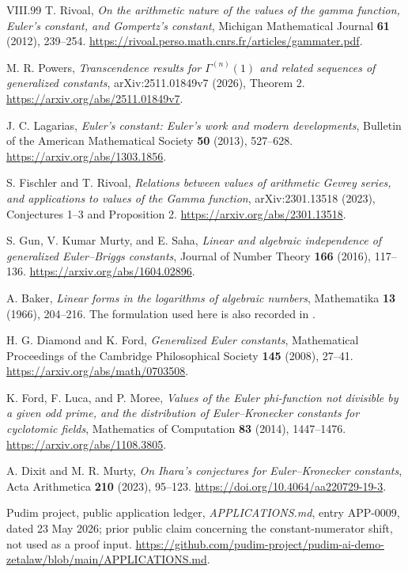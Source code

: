 \documentclass[11pt,a4paper]{article}
\theoremstyle{definition}
\theoremstyle{remark}
\numberwithin{equation}{section}
\begin{document}
\begin{thebibliography}{VIII.99}
T. Rivoal, \emph{On the arithmetic nature of the values of the gamma
function, Euler's constant, and Gompertz's constant},
Michigan Mathematical Journal \textbf{61} (2012), 239--254.
\url{https://rivoal.perso.math.cnrs.fr/articles/gammater.pdf}.

M. R. Powers, \emph{Transcendence results for $\Gamma^{(n)}(1)$ and
related sequences of generalized constants}, arXiv:2511.01849v7
(2026), Theorem 2.
\url{https://arxiv.org/abs/2511.01849v7}.

J. C. Lagarias, \emph{Euler's constant: Euler's work and modern
developments}, Bulletin of the American Mathematical Society
\textbf{50} (2013), 527--628.
\url{https://arxiv.org/abs/1303.1856}.

S. Fischler and T. Rivoal,
\emph{Relations between values of arithmetic Gevrey series, and
applications to values of the Gamma function},
arXiv:2301.13518 (2023), Conjectures 1--3 and Proposition 2.
\url{https://arxiv.org/abs/2301.13518}.

S. Gun, V. Kumar Murty, and E. Saha,
\emph{Linear and algebraic independence of generalized Euler--Briggs
constants}, Journal of Number Theory \textbf{166} (2016), 117--136.
\url{https://arxiv.org/abs/1604.02896}.

A. Baker, \emph{Linear forms in the logarithms of algebraic numbers},
Mathematika \textbf{13} (1966), 204--216.
The formulation used here is also recorded in
\cite[Theorem 14]{p1:GMS2016}.

H. G. Diamond and K. Ford, \emph{Generalized Euler constants},
Mathematical Proceedings of the Cambridge Philosophical Society
\textbf{145} (2008), 27--41.
\url{https://arxiv.org/abs/math/0703508}.

K. Ford, F. Luca, and P. Moree,
\emph{Values of the Euler phi-function not divisible by a given odd
prime, and the distribution of Euler--Kronecker constants for cyclotomic
fields}, Mathematics of Computation \textbf{83} (2014), 1447--1476.
\url{https://arxiv.org/abs/1108.3805}.

A. Dixit and M. R. Murty, \emph{On Ihara's conjectures for
Euler--Kronecker constants}, Acta Arithmetica \textbf{210} (2023), 95--123.
\url{https://doi.org/10.4064/aa220729-19-3}.

Pudim project, public application ledger,
\emph{APPLICATIONS.md}, entry APP-0009, dated 23 May 2026;
prior public claim concerning the constant-numerator shift,
not used as a proof input.
\url{https://github.com/pudim-project/pudim-ai-demo-zetalaw/blob/main/APPLICATIONS.md}.


\end{thebibliography}
\end{document}
